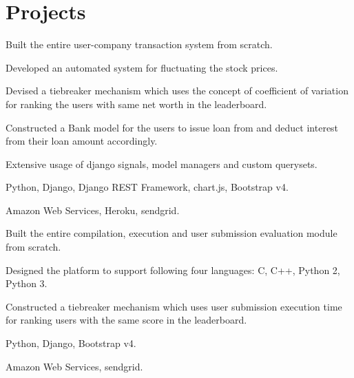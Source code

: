 
\section{Projects}

\begin{tightemize}
\item Built the entire user-company transaction system from scratch.
\item Developed an automated system for fluctuating the stock prices.
\item Devised a tiebreaker mechanism which uses the concept of coefficient of variation for ranking the users with same net worth in the leaderboard.
\item Constructed a Bank model for the users to issue loan from and deduct interest from their loan amount accordingly.
\item Extensive usage of django signals, model managers and custom querysets.
\item {} Python, Django, Django REST Framework, chart.js, Bootstrap v4.
\item {} Amazon Web Services, Heroku, sendgrid.
\end{tightemize}
\sectionsep

\begin{tightemize}
\item Built the entire compilation, execution and user submission evaluation module from scratch.
\item Designed the platform to support following four languages: C, C++, Python 2, Python 3.
\item Constructed a tiebreaker mechanism which uses user submission execution time for ranking users with the same score in the leaderboard.
\item {} Python, Django, Bootstrap v4.
\item {} Amazon Web Services, sendgrid.
\end{tightemize}
\sectionsep